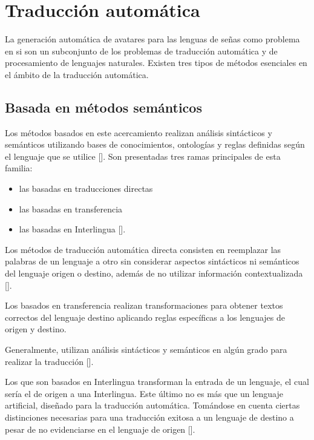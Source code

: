 \section{Traducción automática}\label{section:state-of-the-art:traduccion}
La generación automática de avatares para las lenguas de señas como problema en si son un subconjunto de los
problemas de traducción automática y de procesamiento de lenguajes naturales. Existen tres tipos de métodos esenciales en el
ámbito de la traducción automática.

\subsection{Basada en métodos semánticos}\label{subsection:state-of-the-art:traduccion:semantic}
Los métodos basados en este acercamiento realizan análisis
sintácticos y semánticos utilizando bases de conocimientos, ontologías y reglas definidas según el lenguaje que se utilice [\cite{knight1994building}]. Son presentadas tres ramas
principales de esta familia:
\begin{itemize}
\item las basadas en traducciones directas 
\item las basadas en transferencia 
\item las basadas en Interlingua [\cite{klueva2007semantics}].
\end{itemize}
 
Los métodos de traducción automática directa consisten en reemplazar las palabras de un lenguaje a otro sin considerar aspectos sintácticos ni semánticos del lenguaje origen o destino, además de no utilizar información contextualizada [\cite{okpor2014machine}].

Los basados en transferencia realizan transformaciones para obtener textos correctos del lenguaje destino aplicando reglas específicas a los lenguajes de origen y destino.

Generalmente, utilizan análisis sintácticos y semánticos en algún grado para realizar
la traducción [\cite{gehlot2015hindi}].

Los que son basados en Interlingua transforman la entrada de un lenguaje, el cual sería el de origen a una Interlingua. Este último  no es más que un lenguaje artificial, diseñado para la traducción automática. Tomándose en cuenta ciertas distinciones necesarias para una traducción exitosa a un lenguaje de destino a pesar de no evidenciarse en el lenguaje de origen [\cite{zhu2020language}].

